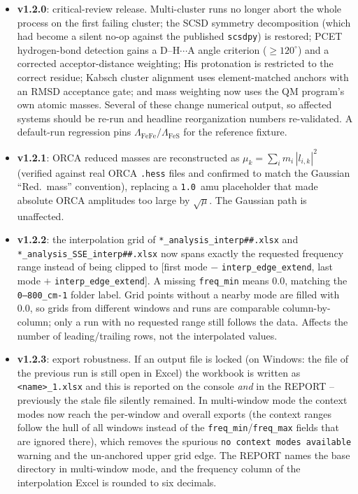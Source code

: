 \documentclass[11pt,a4paper,twoside]{article}
\theoremstyle{remark}
\begin{document}
\begin{infobox}
\begin{itemize}
        Legacy TOML keys (\texttt{analyze\_ss}, \texttt{ss\_chain}) remain
        accepted for backward compatibility.
  \item \textbf{v1.2.0}: critical-review release. Multi-cluster runs no
        longer abort the whole process on the first failing cluster; the
        SCSD symmetry decomposition (which had become a silent no-op against
        the published \texttt{scsdpy}) is restored; PCET hydrogen-bond
        detection gains a D--H$\cdots$A angle criterion ($\geq 120^\circ$)
        and a corrected acceptor-distance weighting; His protonation is
        restricted to the correct residue; Kabsch cluster alignment uses
        element-matched anchors with an RMSD acceptance gate; and mass
        weighting now uses the QM program's own atomic masses. Several of
        these change numerical output, so affected systems should be re-run
        and headline reorganization numbers re-validated. A default-run
        regression pins $\Lambda_\text{FeFe}/\Lambda_\text{FeS}$ for the
        reference fixture.
  \item \textbf{v1.2.1}: ORCA reduced masses are reconstructed as
        $\mu_k = \sum_i m_i\,|l_{i,k}|^2$ (verified against real ORCA
        \texttt{.hess} files and confirmed to match the Gaussian ``Red.\
        mass'' convention), replacing a \texttt{1.0}~amu placeholder that
        made absolute ORCA amplitudes too large by $\sqrt{\mu}$. The
        Gaussian path is unaffected.
  \item \textbf{v1.2.2}: the interpolation grid of
        \texttt{*\_analysis\_interp\#\#.xlsx} and
        \texttt{*\_analysis\_SSE\_interp\#\#.xlsx} now spans exactly the
        requested frequency range instead of being clipped to
        [first mode $-$ \texttt{interp\_edge\_extend},
        last mode $+$ \texttt{interp\_edge\_extend}]. A missing
        \texttt{freq\_min} means $0.0$, matching the
        \texttt{0--800\_cm-1} folder label. Grid points without a nearby
        mode are filled with $0.0$, so grids from different windows and
        runs are comparable column-by-column; only a run with no
        requested range still follows the data. Affects the number of
        leading/trailing rows, not the interpolated values.
  \item \textbf{v1.2.3}: export robustness. If an output file is locked
        (on Windows: the file of the previous run is still open in Excel)
        the workbook is written as \texttt{<name>\_1.xlsx} and this is
        reported on the console \emph{and} in the REPORT -- previously the
        stale file silently remained. In multi-window mode the context
        modes now reach the per-window and overall exports (the context
        ranges follow the hull of all windows instead of the
        \texttt{freq\_min}/\texttt{freq\_max} fields that are ignored
        there), which removes the spurious \texttt{no context modes
        available} warning and the un-anchored upper grid edge. The REPORT
        names the base directory in multi-window mode, and the frequency
        column of the interpolation Excel is rounded to six decimals.
\end{itemize}
\end{infobox}
\end{document}
